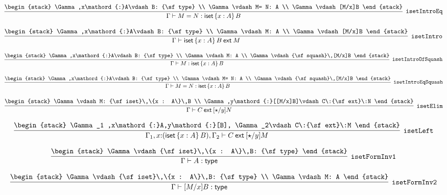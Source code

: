 \[
\infer[{\tt isetIntroEq}]{\Gamma \vdash M= N: {\sf iset}\,\{x : A\}\,B}{
\begin{stack}
\Gamma ,x\mathord{:}A\vdash B: {\sf type}
\\
\Gamma \vdash M= N: A
\\
\Gamma \vdash [M/x]B
\end{stack}}
\]

\[
\infer[{\tt isetIntro}]{\Gamma \vdash {\sf iset}\,\{x : A\}\,B\:{\sf ext}\:M}{
\begin{stack}
\Gamma ,x\mathord{:}A\vdash B: {\sf type}
\\
\Gamma \vdash M: A
\\
\Gamma \vdash [M/x]B
\end{stack}}
\]

\[
\infer[{\tt isetIntroOfSquash}]{\Gamma \vdash M: {\sf iset}\,\{x : A\}\,B}{
\begin{stack}
\Gamma ,x\mathord{:}A\vdash B: {\sf type}
\\
\Gamma \vdash M: A
\\
\Gamma \vdash {\sf squash}\,[M/x]B
\end{stack}}
\]

\[
\infer[{\tt isetIntroEqSquash}]{\Gamma \vdash M= N: {\sf iset}\,\{x : A\}\,B}{
\begin{stack}
\Gamma ,x\mathord{:}A\vdash B: {\sf type}
\\
\Gamma \vdash M= N: A
\\
\Gamma \vdash {\sf squash}\,[M/x]B
\end{stack}}
\]

\[
\infer[{\tt isetElim}]{\Gamma \vdash C\:{\sf ext}\:[\star /y]N}{
\begin{stack}
\Gamma \vdash M: {\sf iset}\,\{x : A\}\,B
\\
\Gamma ,y\mathord{:}[[M/x]B]\vdash C\:{\sf ext}\:N
\end{stack}}
\]

\[
\infer[{\tt isetLeft}]{\Gamma_1 ,x\mathord{:}({\sf iset}\,\{x : A\}\,B), \Gamma_2 \vdash C\:{\sf ext}\:[\star /y]M}{
\begin{stack}
\Gamma_1 ,x\mathord{:}A,y\mathord{:}[B], \Gamma_2\vdash C\:{\sf ext}\:M
\end{stack}}
\]

\[
\infer[{\tt isetFormInv1}]{\Gamma \vdash A: {\sf type}}{
\begin{stack}
\Gamma \vdash {\sf iset}\,\{x : A\}\,B: {\sf type}
\end{stack}}
\]

\[
\infer[{\tt isetFormInv2}]{\Gamma \vdash [M/x]B: {\sf type}}{
\begin{stack}
\Gamma \vdash {\sf iset}\,\{x : A\}\,B: {\sf type}
\\
\Gamma \vdash M: A
\end{stack}}
\]

